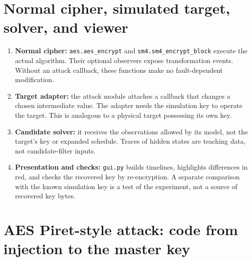 \section{Normal cipher, simulated target, solver, and viewer}
\begin{enumerate}
\item \textbf{Normal cipher:} \texttt{aes.aes\_\allowbreak{}encrypt} and \texttt{sm4.sm4\_\allowbreak{}encrypt\_\allowbreak{}block} execute the actual algorithm. Their optional observers expose transformation events. Without an attack callback, these functions make no fault-dependent modification.
\item \textbf{Target adapter:} the attack module attaches a callback that changes a chosen intermediate value. The adapter needs the simulation key to operate the target. This is analogous to a physical target possessing its own key.
\item \textbf{Candidate solver:} it receives the observations allowed by its model, not the target's key or expanded schedule. Traces of hidden states are teaching data, not candidate-filter inputs.
\item \textbf{Presentation and checks:} \texttt{gui.py} builds timelines, highlights differences in red, and checks the recovered key by re-encryption. A separate comparison with the known simulation key is a test of the experiment, not a source of recovered key bytes.
\end{enumerate}
\begin{center}
\end{center}

\section{AES Piret-style attack: code from injection to the master key}
